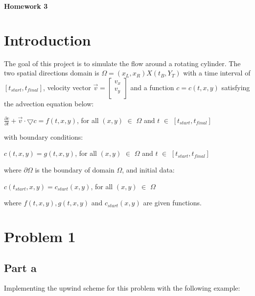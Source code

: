 \documentclass[12pt]{article}
\begin{document}
\centerline{\Large\textbf{Homework 3}}
\vspace{2cm}

\section*{Introduction}\label{sec::Intro}
The goal of this project is to simulate the flow around a rotating cylinder.  The two spatial directions domain is $\Omega = (x_L, x_R) X(t_B,Y_T)$ with a time interval of $[t_{start}, t_{final}]$, velocity vector $\overrightarrow{v} = \begin{bmatrix}
           v_x \\
          v_y \\
         \end{bmatrix}$ and a function $c = c(t,x,y)$ satisfying the advection equation below:\\
\begin{center}
$
\frac{\partial c}{\partial t} + \overrightarrow{v} \cdot \bigtriangledown c = f(t,x,y)$, for all $(x,y)$ $ \in$ $ \Omega$ and $ t$ $ \in$ $ [t_{start},t_{final}]$
\end{center}
with boundary conditions:\\
\begin{center}
$c(t,x,y) = g(t,x,y)$, for all $(x,y)$ $ \in$ $ \Omega$ and $ t$ $ \in$ $ [t_{start},t_{final}]$
\end{center}
where $\partial \Omega$ is the boundary of domain $\Omega$, and initial data:
\begin{center}
$c(t_{start},x,y) = c_{start}(x,y)$, for all $(x,y)$ $ \in$ $ \Omega$
\end{center}
where $f(t,x,y), g(t,x,y)$ and $c_{start}(x,y)$ are given functions.



\section{Problem 1}\label{sec::Problem 1}

\subsection{Part a}\label{sec::a}
Implementing the upwind scheme for this problem with the following example:
\end{document}
